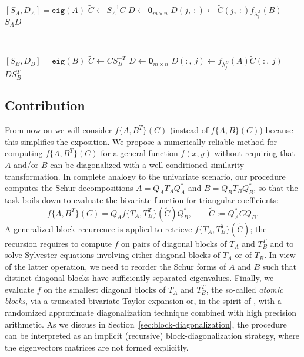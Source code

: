 \documentclass{siamart1116}
\begin{document}
  		\begin{minipage}[t]{.45\linewidth}
  	\begin{algorithm}[H] 
  		\small 
  		\caption{}\label{alg:fun2_diagA}
  		\begin{algorithmic}[1]
  			\State $[S_A, D_A]=\texttt{eig}(A)$
  			\State $\widetilde C\gets S_A^{-1}C$
  			\State $D\gets \mathbf 0_{m\times n}$
  			\State $D(j,\ :)\gets \widetilde C(j,\ :)f_{\lambda_j^A}(B)$
  			\EndFor
  			\State \Return $S_AD$
  			\EndProcedure
  		\end{algorithmic}
  	\end{algorithm} 
  \end{minipage}~
  \begin{minipage}[t]{.45\linewidth}
  	\begin{algorithm}[H] 
  		\small 
  		\caption{}\label{alg:fun2_diagB}
  		\begin{algorithmic}[1]
  		  		\State $[S_B, D_B]=\texttt{eig}(B)$
  		  		  			\State $\widetilde C\gets CS_B^{-T}$
  			\State $D\gets \mathbf 0_{m\times n}$
  			\State $D( :, \ j)\gets f_{\lambda_j^B}(A)\widetilde C( :, \ j)$
  			\EndFor
  			\State \Return $DS_B^T$
  			\EndProcedure
  		\end{algorithmic}
  	\end{algorithm} 
  \end{minipage} 
\subsection{Contribution}
From now on we will consider $f\{A,B^T\}(C)$ (instead of $f\{A,B\}(C)$) because this simplifies the exposition.
We propose a numerically reliable method for computing $f\{A,B^T\}(C)$ for a general function $f(x,y)$
  without requiring that $A$ and/or $B$ can be diagonalized with a well conditioned similarity transformation.
 In complete analogy to the  univariate scenario, 
our procedure computes the Schur decompositions  $A=Q_AT_AQ_A^*$ and $B=Q_BT_BQ_B^*$, so that
the task boils down to evaluate the bivariate function for triangular coefficients:
\[
f\{A,B^T\}(C)= Q_Af\{T_A,T_B^T\}(\widetilde C)Q_B^*,\qquad \widetilde C:=Q_A^*CQ_B.
\]
A generalized block recurrence is applied to retrieve 
$f\{T_A,T_B^T\}(\widetilde C)$; the recursion requires
to compute $f$ on pairs of diagonal blocks of $T_A$ and 
$T_B^T$ and to solve Sylvester equations involving either 
diagonal blocks of $T_A$ or of $T_B$. In view of the latter
operation, we need to reorder the Schur forms of $A$ and $B$
such that distinct diagonal blocks have sufficiently separated
eigenvalues. Finally, we evaluate $f$ on the smallest diagonal
blocks of $T_A$ and $T_B^T$, the so-called \emph{atomic blocks},
via a truncated bivariate Taylor expansion or, in the spirit
of \cite{higham2020multiprecision}, with a randomized 
approximate diagonalization technique combined with high 
precision arithmetic. As we discuss in 
Section~\ref{sec:block-diagonalization}, the procedure can be 
interpreted as an implicit (recursive) block-diagonalization strategy, 
where the eigenvectors matrices are not formed explicitly. 
\end{document}
